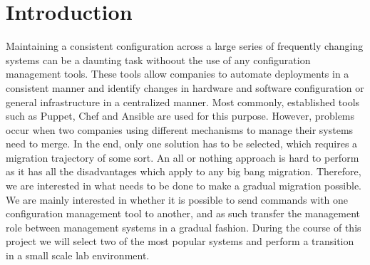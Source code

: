 \section{Introduction}\label{sec:introduction}
Maintaining a consistent configuration across a large series of frequently changing systems can be a daunting task withoout the use of any configuration management tools. These tools  allow companies to automate deployments in a consistent manner and identify changes in hardware and software configuration or general infrastructure in a centralized manner. Most commonly, established tools such as Puppet\cite{whatispuppet}, Chef \cite{whatischef} and Ansible\cite{whatisansible} are used for this purpose. However, problems occur when two companies using different mechanisms to manage their systems need to merge. In the end, only one solution has to be selected, which requires a migration trajectory of some sort. An all or nothing approach is hard to perform as it has all the disadvantages which apply to any big bang migration. Therefore, we are interested in what needs to be done to make a gradual migration possible. We are mainly interested in whether it is possible to send commands with one configuration management tool to another, and as such transfer the management role between management systems in a gradual fashion. During the course of this project we will select two of the most popular systems and perform a transition in a small scale lab environment.
  
